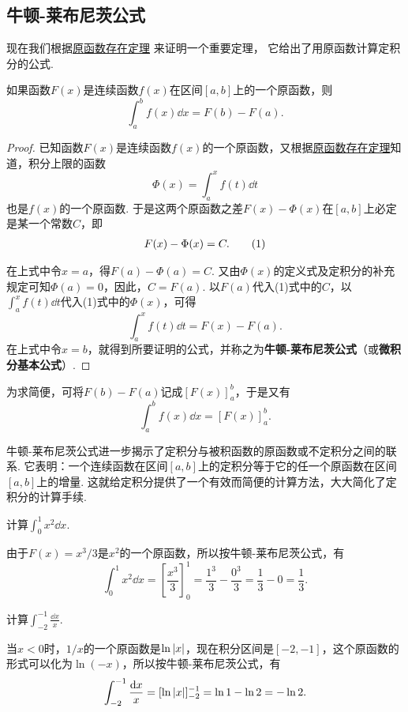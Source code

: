 \subsection{牛顿-莱布尼茨公式}
现在我们根据\hyperref[theorem:定积分.原函数存在定理]{原函数存在定理}%
来证明一个重要定理，%
它给出了用原函数计算定积分的公式.
\begin{theorem}[牛顿-莱布尼茨公式]
如果函数\(F(x)\)是连续函数\(f(x)\)在区间\([a,b]\)上的一个原函数，则
\begin{equation}\label{equation:定积分.牛顿-莱布尼茨公式}
\int_a^b f(x) \dd{x} = F(b) - F(a).
\end{equation}
\begin{proof}
已知函数\(F(x)\)是连续函数\(f(x)\)的一个原函数，又根据\hyperref[theorem:定积分.原函数存在定理]{原函数存在定理}知道，积分上限的函数\[
\Phi(x) = \int_a^x f(t) \dd{t}
\]也是\(f(x)\)的一个原函数.
于是这两个原函数之差\(F(x) - \Phi(x)\)在\([a,b]\)上必定是某一个常数\(C\)，即\begin{gather}
F(x) - \Phi(x) = C. \tag1
\end{gather}

在上式中令\(x=a\)，得\(F(a) - \Phi(a) = C\).
又由\(\Phi(x)\)的定义式及定积分的补充规定可知\(\Phi(a) = 0\)，因此，\(C = F(a)\).
以\(F(a)\)代入(1)式中的\(C\)，以\(\int_a^x f(t) \dd{t}\)代入(1)式中的\(\Phi(x)\)，可得\[
\int_a^x f(t) \dd{t} = F(x) - F(a).
\]在上式中令\(x=b\)，就得到所要证明的公式，并称之为\textbf{牛顿-莱布尼茨公式}（或\textbf{微积分基本公式}）.
\end{proof}
\end{theorem}
为求简便，可将\(F(b) - F(a)\)记成\([F(x)]_a^b\)，于是又有\[
\int_a^b f(x) \dd{x} = [F(x)]_a^b.
\]

牛顿-莱布尼茨公式进一步揭示了定积分与被积函数的原函数或不定积分之间的联系.
它表明：一个连续函数在区间\([a,b]\)上的定积分等于它的任一个原函数在区间\([a,b]\)上的增量.
这就给定积分提供了一个有效而简便的计算方法，大大简化了定积分的计算手续.

\begin{example}
计算\(\int_0^1 x^2 \dd{x}\).
\begin{solution}
由于\(F(x) = x^3/3\)是\(x^2\)的一个原函数，所以按牛顿-莱布尼茨公式，有\[
\int_0^1 x^2 \dd{x} = \left[\frac{x^3}{3}\right]_0^1
= \frac{1^3}{3} - \frac{0^3}{3} = \frac{1}{3} - 0 = \frac{1}{3}.
\]
\end{solution}
\end{example}

\begin{example}
计算\(\int_{-2}^{-1} \frac{\dd{x}}{x}\).
\begin{solution}
当\(x<0\)时，\(1/x\)的一个原函数是\(\ln\abs{x}\)，现在积分区间是\([-2,-1]\)，这个原函数的形式可以化为\(\ln(-x)\)，所以按牛顿-莱布尼茨公式，有\[
\int_{-2}^{-1} \frac{\dd{x}}{x}
= [ \ln\abs{x} ]_{-2}^{-1}
= \ln1 - \ln2
= -\ln2.
\]
\end{solution}
\end{example}

